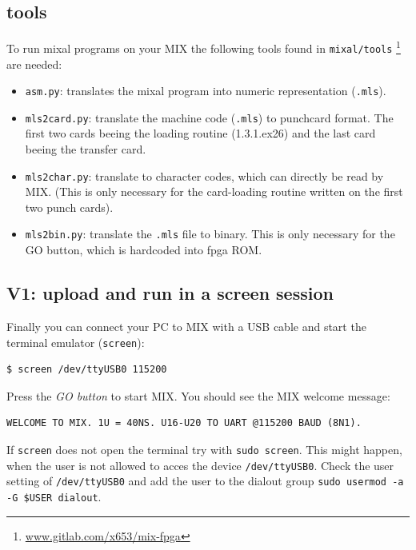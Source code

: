 \documentclass[a4paper,ngerman]{scrartcl}
\begin{document}
\subsection{tools}
To run mixal programs on your MIX the following tools found in \lstinline|mixal/tools| 
\footnote{\href{www.gitlab.com/x653/mix-fpga}{www.gitlab.com/x653/mix-fpga}} are needed:
\begin{itemize}
	\item \lstinline|asm.py|: translates the mixal program into numeric representation (\lstinline|.mls|).
	
	\item \lstinline|mls2card.py|: translate the machine code (\lstinline|.mls|) to punchcard format. The first two cards beeing the loading routine (1.3.1.ex26) and the last card beeing the transfer card.
	
	\item \lstinline|mls2char.py|: translate to character codes, which can directly be read by MIX. (This is only necessary for the card-loading routine written on the first two punch cards).
	
	\item \lstinline|mls2bin.py|: translate the \lstinline|.mls| file to binary. This is only necessary for the GO button, which is hardcoded into fpga ROM.	
\end{itemize}

\subsection{V1: upload and run in a screen session}
Finally you can connect your PC to MIX with a USB cable and start the  terminal emulator (\lstinline|screen|):

\begin{lstlisting}[numbers=none,frame=none]
$ screen /dev/ttyUSB0 115200
\end{lstlisting}

Press the \textit{GO button} to start MIX. You should see the MIX welcome message:

\begin{lstlisting}
WELCOME TO MIX. 1U = 40NS. U16-U20 TO UART @115200 BAUD (8N1).        
\end{lstlisting}

If \lstinline|screen| does not open the terminal try with \lstinline|sudo screen|. This might happen, when the user is not allowed to acces the device \lstinline|/dev/ttyUSB0|. Check the user setting of \lstinline|/dev/ttyUSB0| and add the user to the dialout group \lstinline|sudo usermod -a -G $USER dialout|.
\end{document}
